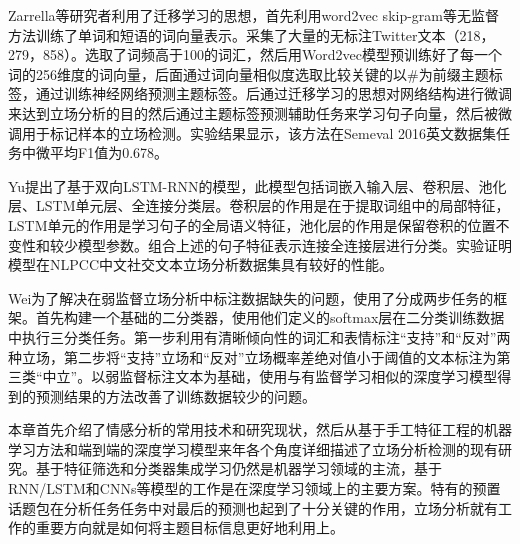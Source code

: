 Zarrella等研究者利用了迁移学习的思想，首先利用word2vec skip-gram等无监督方法训练了单词和短语的词向量表示。采集了大量的无标注Twitter文本（218，279，858）。选取了词频高于100的词汇，然后用Word2vec模型预训练好了每一个词的256维度的词向量，后面通过词向量相似度选取比较关键的以\#为前缀主题标签，通过训练神经网络预测主题标签。后通过迁移学习的思想对网络结构进行微调来达到立场分析的目的然后通过主题标签预测辅助任务来学习句子向量，然后被微调用于标记样本的立场检测。实验结果显示，该方法在Semeval 2016英文数据集任务中微平均F1值为0.678。

Yu提出了基于双向LSTM-RNN的模型，此模型包括词嵌入输入层、卷积层、池化层、LSTM单元层、全连接分类层。卷积层的作用是在于提取词组中的局部特征，LSTM单元的作用是学习句子的全局语义特征，池化层的作用是保留卷积的位置不变性和较少模型参数。组合上述的句子特征表示连接全连接层进行分类。实验证明模型在NLPCC中文社交文本立场分析数据集具有较好的性能。

Wei为了解决在弱监督立场分析中标注数据缺失的问题，使用了分成两步任务的框架。首先构建一个基础的二分类器，使用他们定义的softmax层在二分类训练数据中执行三分类任务。第一步利用有清晰倾向性的词汇和表情标注“支持”和“反对”两种立场，第二步将“支持”立场和“反对”立场概率差绝对值小于阈值的文本标注为第三类“中立”。以弱监督标注文本为基础，使用与有监督学习相似的深度学习模型得到的预测结果的方法改善了训练数据较少的问题。




本章首先介绍了情感分析的常用技术和研究现状，然后从基于手工特征工程的机器学习方法和端到端的深度学习模型来年各个角度详细描述了立场分析检测的现有研究。基于特征筛选和分类器集成学习仍然是机器学习领域的主流，基于RNN/LSTM和CNNs等模型的工作是在深度学习领域上的主要方案。特有的预置话题包在分析任务任务中对最后的预测也起到了十分关键的作用，立场分析就有工作的重要方向就是如何将主题目标信息更好地利用上。
